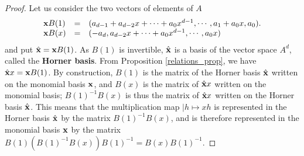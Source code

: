 \documentclass{standalone}
\begin{document}
\begin{proof}
Let us consider the two vectors of elements of $A$
\begin{equation}
	\begin{array}{lll}
		\bold{x}B(1) & = & (a_{d-1} + a_{d-2}x + \cdots + a_0x^{d-1}, \cdots, a_1 + a_0x,  a_0).\\
		\bold{x}B(x) & = & (-a_d, a_{d-2}x + \cdots + a_0x^{d-1}, \cdots, a_0x)
	\end{array}
\end{equation}
and put $\hat{\bold{x}} = \bold{x}B(1)$.
As $B(1)$ is invertible, $\hat{\bold{x}}$ is a basis of the vector space $A^d$, called the {\bf Horner basis}.
From Proposition \ref{relations_prop}, we have $\hat{\bold{x}}x = \bold{x}B(1)$. 
By construction, $B(1)$ is the matrix of the Horner basis $\hat{\bold{x}}$ written on the monomial basis $\bold{x}$, and $B(x)$ is the matrix of $\hat{\bold{x}}x$ written on the monomial basis;
$B(1)^{-1}B(x)$ is thus the matrix of $\hat{\bold{x}}x$ written on the Horner basis $\hat{\bold{x}}$. 
This means that the multiplication map $\left\vert h \mapsto xh\right.$ is represented in the Horner basis $\hat{\bold{x}}$ by the matrix $B(1)^{-1}B(x)$, and is therefore represented in the monomial basis $\bold{x}$ by the matrix $B(1)(B(1)^{-1}B(x))B(1)^{-1} = B(x)B(1)^{-1}$.
\end{proof}
\end{document}
